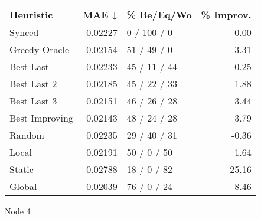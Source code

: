 \begin{tabular}{lrlr}
\toprule
\textbf{Heuristic} & \textbf{MAE ↓} & \textbf{\% Be/Eq/Wo} & \textbf{\% Improv.} \\
\midrule
            Synced &        0.02227 &          0 / 100 / 0 &                0.00 \\
     Greedy Oracle &        0.02154 &          51 / 49 / 0 &                3.31 \\
         Best Last &        0.02233 &         45 / 11 / 44 &               -0.25 \\
       Best Last 2 &        0.02185 &         45 / 22 / 33 &                1.88 \\
       Best Last 3 &        0.02151 &         46 / 26 / 28 &                3.44 \\
    Best Improving &        0.02143 &         48 / 24 / 28 &                3.79 \\
            Random &        0.02235 &         29 / 40 / 31 &               -0.36 \\
             Local &        0.02191 &          50 / 0 / 50 &                1.64 \\
            Static &        0.02788 &          18 / 0 / 82 &              -25.16 \\
            Global &        0.02039 &          76 / 0 / 24 &                8.46 \\
\bottomrule
\end{tabular}
\caption{Node 4}
\label{tab:iid_lr01_le1_bs2_4}
